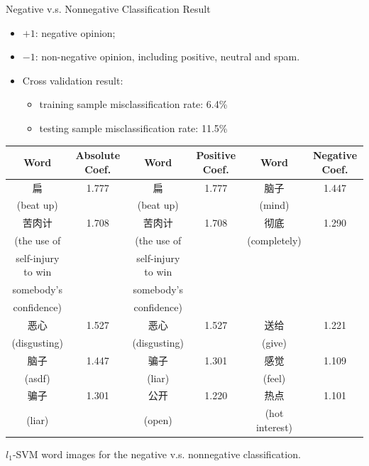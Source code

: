 \documentclass[12pt]{beamer}
\newcommand{\1}[1]{{\mathbf 1}\left\{#1\right\}}        %
\begin{document}
\begin{frame}{Negative v.s. Nonnegative Classification Result}
\begin{itemize}[<+->]
\item $+1$: negative opinion;
\item $-1$: non-negative opinion, including positive, neutral and spam.
\item Cross validation result: 
  \begin{itemize}[<+->]
  \item training sample misclassification rate: 6.4\%
  \item testing sample misclassification rate: 11.5\%
  \end{itemize}

\end{itemize}

\tiny
\begin{tabular}{|c|c||c|c||c|c|}
\hline
Word & Absolute Coef. & Word & Positive Coef. & Word & Negative Coef.\\ \hline  \hline
扁 & 1.777 & 扁 & 1.777 & 脑子 & 1.447\\
(beat up) & & (beat up) & & (mind) & \\\hline
苦肉计 & 1.708 & 苦肉计 & 1.708 & 彻底 & 1.290\\
(the use of  & & (the use of  &  &  (completely) &  \\
self-injury to win & &  self-injury to win &  & &  \\
somebody's & & somebody's  &  & &  \\
 confidence) & &  confidence)  &  & &  \\\hline
恶心 & 1.527 & 恶心 & 1.527 & 送给 & 1.221\\
(disgusting) & & (disgusting) & & (give) & \\\hline
脑子 & 1.447 & 骗子 & 1.301 & 感觉 & 1.109\\
(asdf) & & (liar) & & (feel) & \\\hline
骗子 & 1.301 & 公开 & 1.220 & 热点 & 1.101\\
(liar) & & (open) & & (hot interest) & \\\hline
\end{tabular}
$l_1$-SVM word images for the negative v.s. nonnegative classification.

\end{frame}
\end{document}
